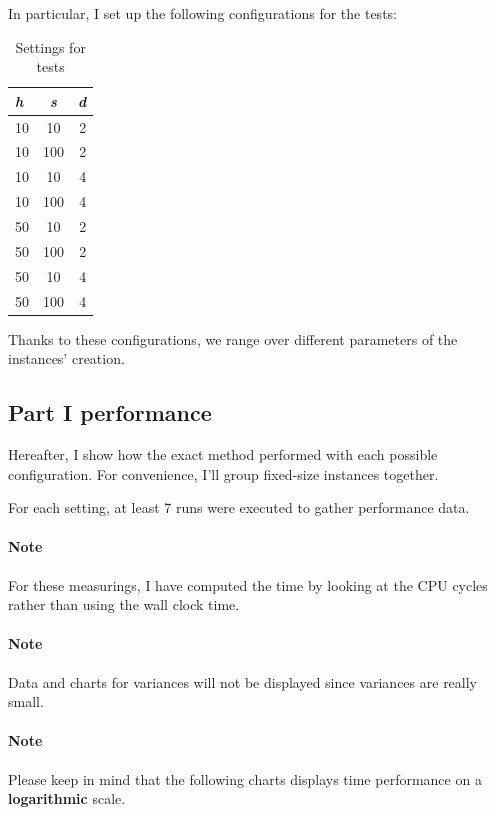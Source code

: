 In particular, I set up the following configurations for the tests:

\begin{table}[H]
  \centering
  \begin{tabular}{|l|c|r|}
    \hline
    \textbf{\textit{h}} & \textbf{\textit{s}} & \textbf{\textit{d}} \\
    \hline
    \hline
    10 & 10  & 2 \\
    \hline
    10 & 100 & 2 \\
    \hline
    10 & 10  & 4 \\
    \hline
    10 & 100 & 4 \\
    \hline
    50 & 10  & 2 \\
    \hline
    50 & 100 & 2 \\
    \hline
    50 & 10  & 4 \\
    \hline
    50 & 100 & 4 \\
    \hline
  \end{tabular}
  \caption{Settings for tests}
  \label{tab:settings}
\end{table}

Thanks to these configurations, we range over different parameters of the
instances' creation.

\subsection{Part I performance}

Hereafter, I show how the exact method performed with each possible
configuration. For convenience, I'll group fixed-size instances together.

For each setting, at least 7 runs were executed to gather performance data.

\paragraph{Note} For these measurings, I have computed the time by looking at
the CPU cycles rather than using the wall clock time.

\paragraph{Note} Data and charts for variances will not be displayed since
variances are really small.

\paragraph{Note} Please keep in mind that the following charts displays time
performance on a \textbf{logarithmic} scale.

